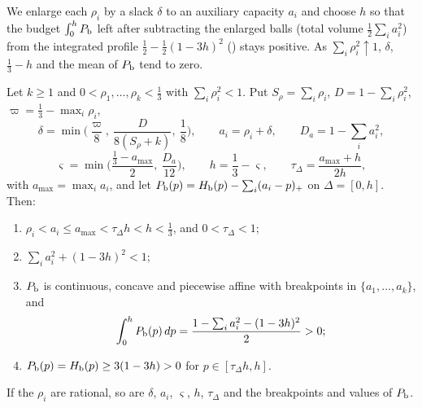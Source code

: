 We enlarge each $\rho_i$ by a slack $\delta$ to an auxiliary capacity $a_i$ and choose $h$ so that the budget $\int_0^hP_{\mathrm b}$ left after subtracting the enlarged balls (total volume $\frac12\sum_ia_i^2$) from the integrated profile $\frac12-\frac12(1-3h)^2$ () stays positive. As $\sum_i\rho_i^2\uparrow1$, $\delta$, $\frac13-h$ and the mean of $P_{\mathrm b}$ tend to zero.

\begin{lemma}\label{lem:cub-auxiliary}
Let $k\ge1$ and $0<\rho_1,\dots,\rho_k<\frac13$ with $\sum_i\rho_i^2<1$. Put $S_\rho=\sum_i\rho_i$, $D=1-\sum_i\rho_i^2$,
$\varpi=\frac13-\max_i\rho_i$,
\[
 \delta=\min\Big(\frac{\varpi}8,\ \frac{D}{8(S_\rho+k)},\ \frac18\Big),\qquad a_i=\rho_i+\delta,\qquad
 D_a=1-\sum_ia_i^2,
\]
\[
 \varsigma=\min\Big(\frac{\frac13-a_{\max}}2,\ \frac{D_a}{12}\Big),\qquad h=\frac13-\varsigma,\qquad
 \tau_\Delta=\frac{a_{\max}+h}{2h},
\]
with $a_{\max}=\max_ia_i$, and let $P_{\mathrm b}(p)=H_{\mathrm b}(p)-\sum_i(a_i-p)_+$ on $\Delta=[0,h]$. Then:
\begin{enumerate}[label=(\roman*)]
\item $\rho_i<a_i\le a_{\max}<\tau_\Delta h<h<\frac13$, and $0<\tau_\Delta<1$;
\item $\sum_ia_i^2+(1-3h)^2<1$;
\item $P_{\mathrm b}$ is continuous, concave and piecewise affine with breakpoints in $\{a_1,\dots,a_k\}$, and
\[
 \int_0^hP_{\mathrm b}(p)\,dp=\frac{1-\sum_ia_i^2-(1-3h)^2}{2}>0 ;
\]
\item $P_{\mathrm b}(p)=H_{\mathrm b}(p)\ge3(1-3h)>0$ for $p\in[\tau_\Delta h,h]$.
\end{enumerate}
If the $\rho_i$ are rational, so are $\delta$, $a_i$, $\varsigma$, $h$, $\tau_\Delta$ and the breakpoints and values of $P_{\mathrm b}$.
\end{lemma}

